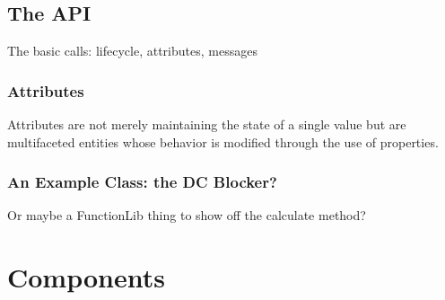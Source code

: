 \documentclass[twoside,10pt]{article}
\newenvironment{packed_item}{
\begin{itemize}
  \setlength{\itemsep}{1pt}
  \setlength{\parskip}{0pt}
  \setlength{\parsep}{0pt}
}{\end{itemize}}
\begin{document}


\subsection{The API}

The basic calls: lifecycle, attributes, messages

\subsubsection{Attributes}

Attributes are not merely maintaining the state of a single value but are multifaceted entities whose behavior is modified through the use of properties\cite{Place:2008params}.


\subsubsection{An Example Class: the DC Blocker?}

Or maybe a FunctionLib thing to show off the calculate method?



\section{Components} %
\end{document}
